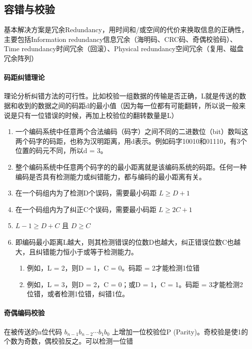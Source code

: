 \documentclass[]{report}
\begin{document}
	\subsection{容错与校验}
		基本解决方案是冗余Redundancy，用时间和/或空间的代价来换取信息的正确性，主要包括Information redundancy信息冗余（海明码、CRC码、奇偶校验码）、Time redundancy时间冗余（回滚）、Physical redundancy空间冗余（复用、磁盘冗余阵列）
		\paragraph{码距纠错理论} 理论分析纠错方法的可行性。比如校验一组数据的传输是否正确，L就是传送的数据和收到的数据之间的码距d的最小值（因为每一位都有可能翻转，所以说一般来说是只有一位错误的时候，再加上校验位的翻转数量是L）
		\begin{enumerate}
			\item 一个编码系统中任意两个合法编码（码字）之间不同的二进数位（bit）数叫这两个码字的码距，也称为汉明距离，用d表示。例如码字10010和01110，有3个位置的码元不同，所以d = 3。
			\item 整个编码系统中任意两个码字的的最小距离就是该编码系统的码距。任何一种编码是否具有检测能力或纠错能力，都与编码的最小距离有关。
			\item 在一个码组内为了检测D个误码，需要最小码距 $L\ge D+1$
			\item 在一个码组内为了纠正C个误码，需要最小码距 $L\ge 2C+1$
			\item $L-1 \ge D+C$ 且 $D\ge C$
			\item 即编码最小距离L越大，则其检测错误的位数D也越大，纠正错误位数C也越大，且纠错能力恒小于或等于检测能力。
			\begin{enumerate}
				\item 例如，L = 2，则D = 1，C = 0。码距 = 2才能检测1位错
				\item 例如，L = 3，则D = 2，C = 0；或D = 1，C = 1。码距 = 3才能检测2位错，或者检测1位错，纠错1位。
			\end{enumerate}
		\end{enumerate}
		\paragraph{奇偶编码校验} 在被传送的n位代码 $b_{n-1}b_{n-2}\cdots b_1b_0$ 上增加一位校验位P (Parity)。奇校验是使1的个数为奇数，偶校验反之。可以检测一位错
\end{document}
